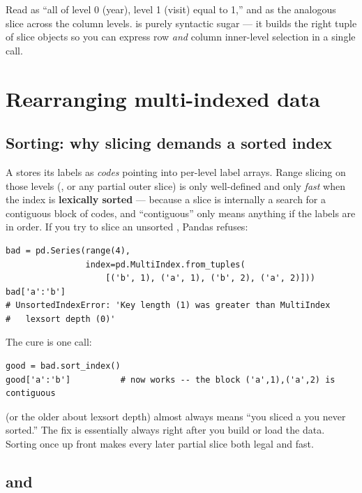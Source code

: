 \documentclass[11pt]{article}
\begin{document}
Read  as ``all of level 0 (year), level 1 (visit) equal to 1,'' and  as the analogous slice across the column levels.  is purely syntactic sugar --- it builds the right tuple of slice objects so you can express row \emph{and} column inner-level selection in a single  call.

\section{Rearranging multi-indexed data}

\subsection{Sorting: why slicing demands a sorted index}

A  stores its labels as \emph{codes} pointing into per-level label arrays. Range slicing on those levels (, or any partial outer slice) is only well-defined and only \emph{fast} when the index is \textbf{lexically sorted} --- because a slice is internally a search for a contiguous block of codes, and ``contiguous'' only means anything if the labels are in order. If you try to slice an unsorted , Pandas refuses:

\begin{lstlisting}
bad = pd.Series(range(4),
                index=pd.MultiIndex.from_tuples(
                    [('b', 1), ('a', 1), ('b', 2), ('a', 2)]))
bad['a':'b']
# UnsortedIndexError: 'Key length (1) was greater than MultiIndex
#   lexsort depth (0)'
\end{lstlisting}

The cure is one call:

\begin{lstlisting}
good = bad.sort_index()
good['a':'b']          # now works -- the block ('a',1),('a',2) is contiguous
\end{lstlisting}

\begin{pitfall}
 (or the older  about lexsort depth) almost always means ``you sliced a  you never sorted.'' The fix is essentially always  right after you build or load the data. Sorting once up front makes every later partial slice both legal and fast.
\end{pitfall}

\subsection{ and }
\end{document}

